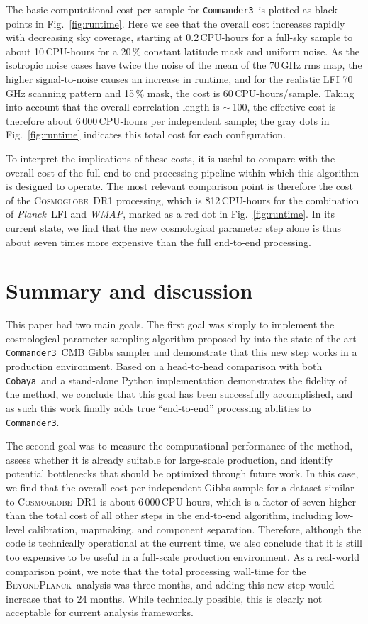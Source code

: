 \documentclass[twocolumn]{../common/aa}
\def\WMAP{\emph{WMAP}}
\def\Planck{\emph{Planck}}
\def\commanderthree{\texttt{Commander3}}
\def\cobaya{\texttt{Cobaya}}
\newcommand{\BP}{\textsc{BeyondPlanck}}
\newcommand{\cosmoglobe}{\textsc{Cosmoglobe}}
\begin{document}
The basic computational cost per sample for \commanderthree\ is plotted as black points in Fig.~\ref{fig:runtime}. Here we see that the overall cost increases rapidly with decreasing sky coverage, starting at 0.2\,CPU-hours for a full-sky sample to about 10\,CPU-hours for a 20\,\% constant latitude mask and uniform noise. As the isotropic noise cases have twice the noise of the mean of the 70\,GHz rms map, the higher signal-to-noise causes an increase in runtime, and for the realistic LFI 70\,GHz scanning pattern and 15\,\% mask, the cost is 60\,CPU-hours/sample. Taking into account that the overall correlation length is $\sim$\,100, the effective cost is therefore about 6\,000\,CPU-hours per independent sample; the gray dots in Fig.~\ref{fig:runtime} indicates this total cost for each configuration.

To interpret the implications of these costs, it is useful to compare with the overall cost of the full end-to-end processing pipeline within which this algorithm is designed to operate. The most relevant comparison point is therefore the cost of the \cosmoglobe\ DR1 processing, which is 812\,CPU-hours for the combination of \Planck\ LFI and \WMAP, marked as a red dot in Fig.~\ref{fig:runtime}. In its current state, we find that the new cosmological parameter step alone is thus about seven times more expensive than the full end-to-end processing. 

\section{Summary and discussion}
\label{sec:conclusions}

This paper had two main goals. The first goal was simply to implement the cosmological parameter sampling algorithm proposed by \citet{racine:2016} into the state-of-the-art \commanderthree\ CMB Gibbs sampler and demonstrate that this new step works in a production environment. Based on a head-to-head comparison with both \cobaya\ and a stand-alone Python implementation demonstrates the fidelity of the method, we conclude that this goal has been successfully accomplished, and as such this work finally adds true ``end-to-end'' processing abilities to \commanderthree. 

The second goal was to measure the computational performance of the method, assess whether it is already suitable for large-scale production, and identify potential bottlenecks that should be optimized through future work. In this case, we find that the overall cost per independent Gibbs sample for a dataset similar to \cosmoglobe\ DR1 is about 6\,000\,CPU-hours, which is a factor of seven higher than the total cost of all other steps in the end-to-end algorithm, including low-level calibration, mapmaking, and component separation. Therefore, although the code is technically operational at the current time, we also conclude that it is still too expensive to be useful in a full-scale production environment. As a real-world comparison point, we note that the total processing wall-time for the \BP\ analysis was three months, and adding this new step would increase that to 24 months. While technically possible, this is clearly not acceptable for current analysis frameworks.
\end{document}
